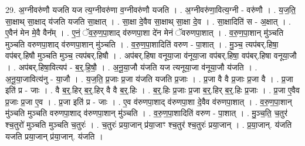 \documentclass[17pt]{extarticle}
\begin{document}
29. अ॒ग्नीवरु॑णौ यजति यज त्य॒ग्नीवरु॑णा व॒ग्नीवरु॑णौ यजति । . अ॒ग्नीवरु॑णा॒वित्य॒ग्नी - वरु॑णौ । . य॒ज॒ति॒ सा॒क्षाथ् सा॒क्षाद् य॑जति यजति सा॒क्षात् । . सा॒क्षा दे॒वैव सा॒क्षाथ् सा॒क्षा दे॒व । . सा॒क्षादिति॑ स - अ॒क्षात् । . ए॒वैन॑ मेन मे॒वै वैन᳚म् । . ए॒नं॒ ॅव॒रु॒ण॒पा॒शाद् व॑रुणपा॒शा दे॑न मेनं ॅवरुणपा॒शात् । . व॒रु॒ण॒पा॒शान् मु॑ञ्चति मुञ्चति वरुणपा॒शाद् व॑रुणपा॒शान् मु॑ञ्चति । . व॒रु॒ण॒पा॒शादिति॑ वरुण - पा॒शात् । . मु॒ञ्च॒ त्यप॑बर्.हिषा॒ वप॑बर्.हिषौ मुञ्चति मुञ्च॒ त्यप॑बर्.हिषौ । . अप॑बर्.हिषा वनूया॒जा व॑नूया॒जा वप॑बर्.हिषा॒ वप॑बर्.हिषा वनूया॒जौ । . अप॑बर्.हिषा॒वित्यप॑ - ब॒र्॒.हि॒षौ॒ । . अ॒नू॒या॒जौ य॑जति यज त्यनूया॒जा व॑नूया॒जौ य॑जति । . अ॒नू॒या॒जावित्य॑नु - या॒जौ । . य॒ज॒ति॒ प्र॒जाः प्र॒जा य॑जति यजति प्र॒जाः । . प्र॒जा वै वै प्र॒जाः प्र॒जा वै । . प्र॒जा इति॑ प्र - जाः । . वै ब॒र्॒.हिर् ब॒र्॒.हिर् वै वै ब॒र्॒.हिः । . ब॒र्॒.हिः प्र॒जाः प्र॒जा ब॒र्॒.हिर् ब॒र्॒.हिः प्र॒जाः । . प्र॒जा ए॒वैव प्र॒जाः प्र॒जा ए॒व । . प्र॒जा इति॑ प्र - जाः । . ए॒व व॑रुणपा॒शाद् व॑रुणपा॒शा दे॒वैव व॑रुणपा॒शात् । . व॒रु॒ण॒पा॒शान् मु॑ञ्चति मुञ्चति वरुणपा॒शाद् व॑रुणपा॒शान् मु॑ञ्चति । . व॒रु॒ण॒पा॒शादिति॑ वरुण - पा॒शात् । . मु॒ञ्च॒ति॒ च॒तुर॑ श्च॒तुरो॑ मुञ्चति मुञ्चति च॒तुरः॑ । . च॒तुरः॑ प्रया॒जान् प्र॑या॒जाꣳ श्च॒तुर॑ श्च॒तुरः॑ प्रया॒जान् । . प्र॒या॒जान्. य॑जति यजति प्रया॒जान् प्र॑या॒जान्. य॑जति । \newline
\end{document}
